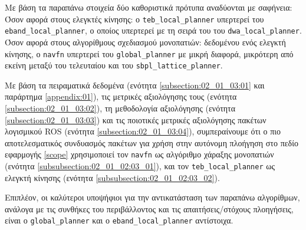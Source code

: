 Με βάση τα παραπάνω στοιχεία δύο καθοριστικά πρότυπα αναδύονται με σαφήνεια:
Όσον αφορά στους ελεγκτές κίνησης: ο \texttt{teb\_local\_planner} υπερτερεί του
\texttt{eband\_local\_planner}, ο οποίος υπερτερεί με τη σειρά του του
\texttt{dwa\_local\_planner}. Όσον αφορά στους αλγορίθμους σχεδιασμού
μονοπατιών: δεδομένου ενός ελεγκτή κίνησης, ο \texttt{navfn} υπερτερεί του
\texttt{global\_planner} με μικρή διαφορά, μικρότερη από εκείνη μεταξύ του
τελευταίου και του \texttt{sbpl\_lattice\_planner}.

\begin{bw_box}
Με βάση τα πειραματικά δεδομένα (ενότητα \ref{subsection:02_01_03:01}
και παράρτημα \ref{appendix:01}), τις μετρικές αξιολόγησης τους (ενότητα
\ref{subsection:02_01_03:02}), τη μεθοδολογία αξιολόγησης (ενότητα
\ref{subsection:02_01_03:03}) και τις ποιοτικές μετρικές αξιολόγησης πακέτων
λογισμικού ROS (ενότητα \ref{subsection:02_01_03:04}), συμπεραίνουμε ότι ο
πιο αποτελεσματικός συνδυασμός πακέτων για χρήση στην αυτόνομη πλοήγηση στο
πεδίο εφαρμογής \ref{scope} χρησιμοποιεί τον \texttt{navfn} ως αλγόριθμο χάραξης
μονοπατιών (ενότητα \ref{subsubsection:02_01_02:03_01}), και τον
\texttt{teb\_local\_planner} ως ελεγκτή κίνησης (ενότητα
\ref{subsubsection:02_01_02:03_02}).
\end{bw_box}

Επιπλέον, οι καλύτεροι υποψήφιοι για την αντικατάσταση των παραπάνω
αλγορίθμων, ανάλογα με τις συνθήκες του περιβάλλοντος και τις
απαιτήσεις/στόχους πλοηγήσεις, είναι ο \texttt{global\_planner} και ο
\texttt{eband\_local\_planner} αντίστοιχα.
